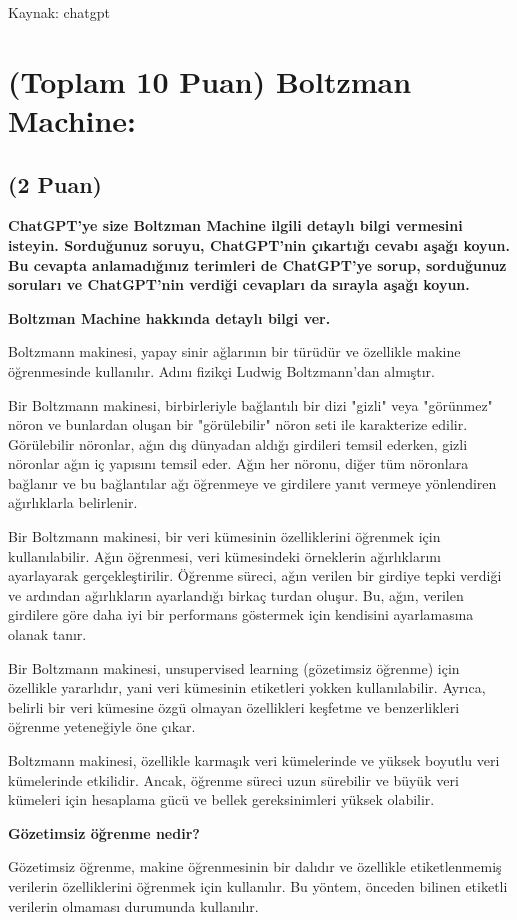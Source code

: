 \documentclass[11pt]{article}
\begin{document}
Kaynak: chatgpt
\section{(Toplam 10 Puan) Boltzman Machine:}

\subsection{(2 Puan)} \textbf{ChatGPT’ye size Boltzman Machine ilgili detaylı bilgi vermesini isteyin. Sorduğunuz soruyu, ChatGPT'nin çıkartığı cevabı aşağı koyun. Bu cevapta anlamadığınız terimleri de ChatGPT’ye sorup, sorduğunuz soruları ve ChatGPT’nin verdiği cevapları da sırayla aşağı koyun.}

\textbf{Boltzman Machine hakkında detaylı bilgi ver.}

Boltzmann makinesi, yapay sinir ağlarının bir türüdür ve özellikle makine öğrenmesinde kullanılır. Adını fizikçi Ludwig Boltzmann'dan almıştır.

Bir Boltzmann makinesi, birbirleriyle bağlantılı bir dizi "gizli" veya "görünmez" nöron ve bunlardan oluşan bir "görülebilir" nöron seti ile karakterize edilir. Görülebilir nöronlar, ağın dış dünyadan aldığı girdileri temsil ederken, gizli nöronlar ağın iç yapısını temsil eder. Ağın her nöronu, diğer tüm nöronlara bağlanır ve bu bağlantılar ağı öğrenmeye ve girdilere yanıt vermeye yönlendiren ağırlıklarla belirlenir.

Bir Boltzmann makinesi, bir veri kümesinin özelliklerini öğrenmek için kullanılabilir. Ağın öğrenmesi, veri kümesindeki örneklerin ağırlıklarını ayarlayarak gerçekleştirilir. Öğrenme süreci, ağın verilen bir girdiye tepki verdiği ve ardından ağırlıkların ayarlandığı birkaç turdan oluşur. Bu, ağın, verilen girdilere göre daha iyi bir performans göstermek için kendisini ayarlamasına olanak tanır.

Bir Boltzmann makinesi, unsupervised learning (gözetimsiz öğrenme) için özellikle yararlıdır, yani veri kümesinin etiketleri yokken kullanılabilir. Ayrıca, belirli bir veri kümesine özgü olmayan özellikleri keşfetme ve benzerlikleri öğrenme yeteneğiyle öne çıkar.

Boltzmann makinesi, özellikle karmaşık veri kümelerinde ve yüksek boyutlu veri kümelerinde etkilidir. Ancak, öğrenme süreci uzun sürebilir ve büyük veri kümeleri için hesaplama gücü ve bellek gereksinimleri yüksek olabilir.

\textbf{Gözetimsiz öğrenme nedir?}

Gözetimsiz öğrenme, makine öğrenmesinin bir dalıdır ve özellikle etiketlenmemiş verilerin özelliklerini öğrenmek için kullanılır. Bu yöntem, önceden bilinen etiketli verilerin olmaması durumunda kullanılır.
\end{document}
